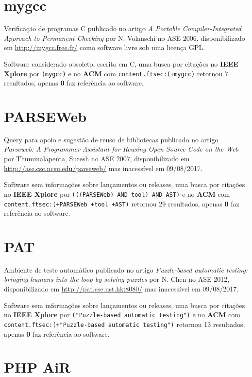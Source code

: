 \section{mygcc}

Verificação de programas C
publicado no artigo {\it A Portable Compiler-Integrated Approach to Permanent Checking}
por N. Volanschi
no ASE 2006,
disponibilizado em \url{http://mygcc.free.fr/}
como software livre
sob uma licença GPL.

Software considerado obsoleto,
escrito em C,
uma busca por citações no {\bf IEEE Xplore} por
\texttt{(mygcc)}
e no {\bf ACM} com
\texttt{content.ftsec:(+mygcc)}
retornou
7 resultados, apenas
{\bf 0} faz referência ao software.



\section{PARSEWeb}

Query para apoio e sugestão de reuso de bibliotecas
publicado no artigo {\it Parseweb: A Programmer Assistant for Reusing Open Source Code on the Web}
por Thummalapenta, Suresh
no ASE 2007,
disponibilizado em \url{http://ase.csc.ncsu.edu/parseweb/}
mas inacessível em 09/08/2017.

Software sem informações sobre lançamentos ou releases,
uma busca por citações no {\bf IEEE Xplore} por
\texttt{(((PARSEWeb) AND tool) AND AST)}
e no {\bf ACM} com
\texttt{content.ftsec:(+PARSEWeb +tool +AST)}
retornou
29 resultados, apenas
{\bf 0} faz referência ao software.



\section{PAT}

Ambiente de teste automático
publicado no artigo {\it Puzzle-based automatic testing: bringing humans into the loop by solving puzzles}
por N. Chen
no ASE 2012,
disponibilizado em \url{http://pat.cse.ust.hk:8080/}
mas inacessível em 09/08/2017.

Software sem informações sobre lançamentos ou releases,
uma busca por citações no {\bf IEEE Xplore} por
\texttt{("Puzzle-based automatic testing")}
e no {\bf ACM} com
\texttt{content.ftsec:(+"Puzzle-based automatic testing")}
retornou
13 resultados, apenas
{\bf 0} faz referência ao software.



\section{PHP AiR}


